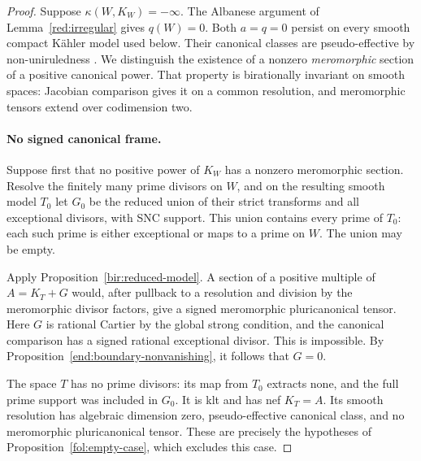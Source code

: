 \documentclass[11pt,letterpaper]{article}
\theoremstyle{definition}
\theoremstyle{remark}
\begin{document}
\begin{proof}
Suppose \(\kappa(W,K_W)=-\infty\). The Albanese argument
of Lemma~\ref{red:irregular} gives \(q(W)=0\). Both
\(a=q=0\) persist on every smooth compact K\"ahler model used
below. Their canonical classes are pseudo-effective by
non-uniruledness \cite{OuUniruledness}. We distinguish the existence
of a nonzero \emph{meromorphic} section of a positive canonical
power. That property is birationally invariant on smooth spaces:
Jacobian comparison gives it on a common resolution, and
meromorphic tensors extend over codimension two.

\paragraph{No signed canonical frame.}
Suppose first that no positive power of \(K_W\) has a nonzero
meromorphic section. Resolve the finitely many prime divisors on
\(W\), and on the resulting smooth model \(T_0\) let \(G_0\)
be the reduced union of their strict transforms and all exceptional
divisors, with SNC support. This union contains every prime of
\(T_0\): each such prime is either exceptional or maps to a prime
on \(W\). The union may be empty.

Apply Proposition~\ref{bir:reduced-model}. A section of a positive
multiple of \(A=K_T+G\) would, after pullback to a resolution and
division by the meromorphic divisor factors, give a signed
meromorphic pluricanonical tensor. Here \(G\) is rational Cartier
by the global strong condition, and the canonical comparison has a
signed rational exceptional divisor. This is impossible. By
Proposition~\ref{end:boundary-nonvanishing}, it follows that
\(G=0\).

The space \(T\) has no prime divisors: its map from \(T_0\)
extracts none, and the full prime support was included in \(G_0\).
It is klt and has nef \(K_T=A\). Its smooth resolution has
algebraic dimension zero, pseudo-effective canonical class, and no
meromorphic pluricanonical tensor. These are precisely the
hypotheses of Proposition~\ref{fol:empty-case}, which excludes this case.


\end{proof}
\end{document}
